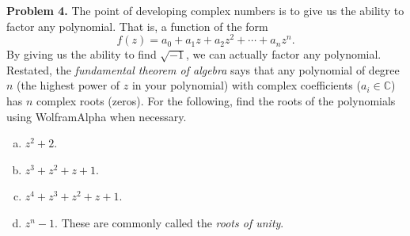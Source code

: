 \documentclass[12pt]{report} %
\newcommand{\C}{\mathbb{C}}
\theoremstyle{definition}
\begin{document}
\noindent\textbf{Problem 4.} The point of developing complex numbers is to give us the ability to factor any polynomial.  That is, a function of the form
\[
f(z)=a_0 + a_1 z + a_2 z^2 + \cdots + a_n z^n.
\]
By giving us the ability to find $\sqrt{-1}$, we can actually factor any polynomial.  Restated, the \emph{fundamental theorem of algebra} says that any polynomial of degree $n$ (the highest power of $z$ in your polynomial) with complex coefficients ($a_i \in \C$) has $n$ complex roots (zeros).  
For the following, find the roots of the polynomials using WolframAlpha when necessary.
\begin{enumerate}[(a)]
    \item $z^2+2$.
    \item $z^3+z^2+z+1$.
    \item $z^4+z^3+z^2+z+1$.
    \item $z^n-1$. These are commonly called the \emph{roots of unity}.
\end{enumerate}
\end{document}
